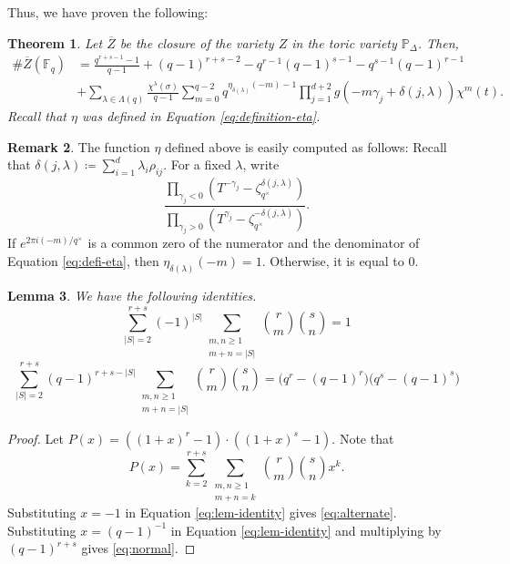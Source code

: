 \documentclass[11pt, reqno]{amsart}
\theoremstyle{plain}
\newtheorem{theo}{Theorem}[section]
\newtheorem{lem}[theo]{Lemma}
\theoremstyle{definition}
\newtheorem{rem}[theo]{Remark}
\newcommand{\Ps}{\mathbb{P}}
\newcommand{\F}{\mathbb{F}}
\newcommand{\ga}{\gamma}
\begin{document}
Thus, we have proven the following:
\begin{theo}\label{theo:point-count-p-delta}
    Let $\overline{Z}$ be the closure of the variety $Z$ in the toric variety $\Ps_{\Delta}$. Then,
\begin{align}
    \#\overline{Z}(\F_q)&= \frac{q^{r+s-1}-1}{q-1}+ (q-1)^{r+s-2} -q^{r-1}(q-1)^{s-1}- q^{s-1}(q-1)^{r-1}\nonumber\\
     &+\sum_{\lambda \in \Lambda(q)}  \frac{\chi^{\lambda}(\sigma)}{q-1}\sum_{m=0}^{q-2}q^{\eta_{\delta(\lambda)}(-m)-1} \prod_{j=1}^{d+2}g\left(-m\gamma_j + \delta(j,\lambda)\right) \chi^{m}\left(t\right). \label{eq:point-count-p-delta}
\end{align}
Recall that $\eta$ was defined in Equation \eqref{eq:definition-eta}.
\end{theo}

\begin{rem}
The function $\eta$ defined above is easily computed as follows:
Recall that $\delta(j,\lambda)\coloneqq \sum_{i=1}^d \lambda_i \rho_{ij}$.
For a fixed $\lambda$, write 
\begin{equation}\label{eq:defi-eta}
 \frac{ \prod_{\gamma_j<0} \left(T^{-\ga_j}- \zeta_{q^\times}^{\delta(j,\lambda)}\right)}{ \prod_{\gamma_j>0} \left(T^{\ga_j}- \zeta_{q^\times}^{-\delta(j,\lambda)}\right)}.   
\end{equation}
If $e^{2\pi i (-m)/q^\times}$ is a common zero of the numerator and the denominator of Equation \eqref{eq:defi-eta}, then $\eta_{\delta(\lambda)}(-m)=1$. Otherwise, it is equal to $0$.
\end{rem}



\begin{lem}\label{lem:identities} We have the following identities. 
    \begin{equation}\label{eq:alternate}
        \sum_{|S|=2}^{r+s} (-1)^{|S|} \sum_{\substack{m,n\ge 1\\ m+n=|S|}} {\binom{r}{m}}{\binom{s}{n}} =1
   \end{equation}
   \begin{equation}\label{eq:normal}
       \sum_{|S|=2}^{r+s} (q-1)^{r+s-|S|}  \sum_{\substack{m,n\ge 1\\ m+n=|S|}} {\binom{r}{m}}{\binom{s}{n}} = \big(q^{r}-(q-1)^{r}\big)\big(q^{s}-(q-1)^{s}\big)
   \end{equation}  
\end{lem}
\begin{proof}
Let $P(x)=((1+x)^{r}-1)\cdot ((1+x)^{s}-1)$. Note that 
\begin{equation}\label{eq:lem-identity}
 P(x)=\sum_{k=2}^{r+s} \sum_{\substack{m,n\ge 1\\ m+n=k}} {\binom{r}{m}}{\binom{s}{n}}x^{k}.   
\end{equation}
Substituting $x=-1$ in Equation \eqref{eq:lem-identity} gives \eqref{eq:alternate}. 
Substituting $x=(q-1)^{-1}$ in Equation \eqref{eq:lem-identity} and multiplying by $(q-1)^{r+s}$ gives \eqref{eq:normal}.
\end{proof}
\end{document}
